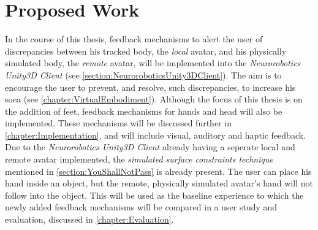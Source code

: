 
\chapter{Proposed Work}\label{chapter:ProposedWork}

In the course of this thesis, feedback mechanisms to alert the user of discrepancies between his tracked body, the 
\textit{local} avatar, and his physically simulated body, the \textit{remote} avatar, will be implemented into the \textit{Neurorobotics Unity3D Client} (see \autoref{section:NeuroroboticsUnity3DClient}). The aim is to encourage the user to prevent, and resolve, such discrepancies, to increase his \gls{soea} (see \autoref{chapter:VirtualEmbodiment}).
\newline
Although the focus of this thesis is on the addition of feet, feedback mechanisms for hands and head will also be implemented. These mechanisms will be discussed further in \autoref{chapter:Implementation}, and will include visual, auditory and haptic feedback.
\newline
Due to the \textit{Neurorobotics Unity3D Client} already having a seperate local and remote avatar implemented, the \textit{simulated surface constraints technique} mentioned in \autoref{section:YouShallNotPass} is already present. The user can place his hand inside an object, but the remote, physically simulated avatar's hand will not follow into the object.
\newline
This will be used as the baseline experience to which the newly added feedback mechanisms will be compared in a user study and evaluation, discussed in \autoref{chapter:Evaluation}.